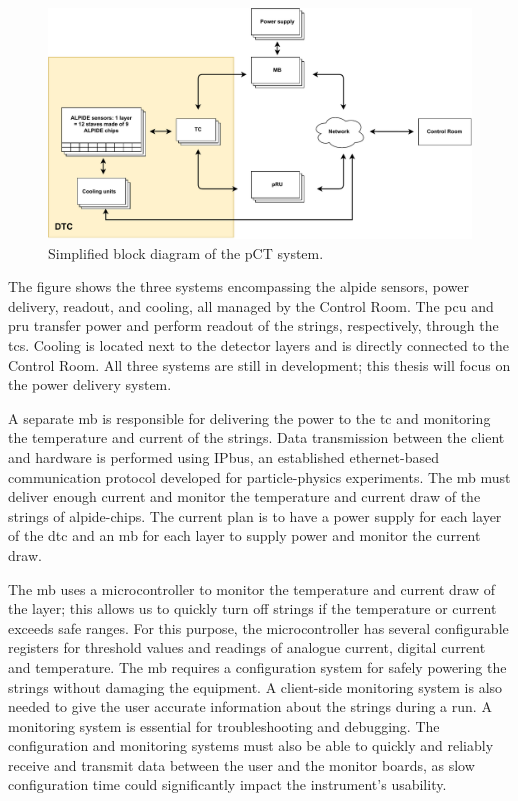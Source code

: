 \documentclass[main.tex]{subfiles}
\begin{document}
\begin{figure}[!htpb]
    \centering
    \includegraphics[scale = 0.65]{images/dcs_concept_renewed.pdf}
    \caption{Simplified block diagram of the pCT system.}
    \label{fig: dcs_renewed}
\end{figure}
\FloatBarrier

The figure shows the three systems encompassing the \gls{alpide} sensors, power delivery, readout, and cooling, all managed by the Control Room. The \gls{pcu} and \gls{pru} transfer power and perform readout of the strings, respectively, through the \gls{tc}s. Cooling is located next to the detector layers and is directly connected to the Control Room. All three systems are still in development; this thesis will focus on the power delivery system.

A separate \gls{mb} is responsible for delivering the power to the \gls{tc} and monitoring the temperature and current of the strings. Data transmission between the client and hardware is performed using IPbus, an established ethernet-based communication protocol developed for particle-physics experiments. The \gls{mb} must deliver enough current and monitor the temperature and current draw of the strings of \gls{alpide}-chips. The current plan is to have a power supply for each layer of the \gls{dtc} and an \gls{mb} for each layer to supply power and monitor the current draw. \par

The \gls{mb} uses a microcontroller to monitor the temperature and current draw of the layer; this allows us to quickly turn off strings if the temperature or current exceeds safe ranges. For this purpose, the microcontroller has several configurable registers for threshold values and readings of analogue current, digital current and temperature. The \gls{mb} requires a configuration system for safely powering the strings without damaging the equipment. A client-side monitoring system is also needed to give the user accurate information about the strings during a run. A monitoring system is essential for troubleshooting and debugging. The configuration and monitoring systems must also be able to quickly and reliably receive and transmit data between the user and the monitor boards, as slow configuration time could significantly impact the instrument's usability.
\end{document}
